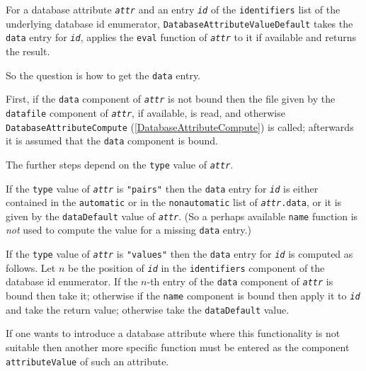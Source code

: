 \documentclass[a4paper,11pt]{report}
\begin{document}
{{{ For a database attribute \mbox{\texttt{\mdseries\slshape attr}} and an entry \mbox{\texttt{\mdseries\slshape id}} of the \texttt{identifiers} list of the underlying database id enumerator, \texttt{DatabaseAttributeValueDefault} takes the \texttt{data} entry for \mbox{\texttt{\mdseries\slshape id}}, applies the \texttt{eval} function of \mbox{\texttt{\mdseries\slshape attr}} to it if available and returns the result. 

 So the question is how to get the \texttt{data} entry. 

 First, if the \texttt{data} component of \mbox{\texttt{\mdseries\slshape attr}} is not bound then the file given by the \texttt{datafile} component of \mbox{\texttt{\mdseries\slshape attr}}, if available, is read, and otherwise \texttt{DatabaseAttributeCompute} (\ref{DatabaseAttributeCompute}) is called; afterwards it is assumed that the \texttt{data} component is bound. 

 The further steps depend on the \texttt{type} value of \mbox{\texttt{\mdseries\slshape attr}}. 

 If the \texttt{type} value of \mbox{\texttt{\mdseries\slshape attr}} is \texttt{"pairs"} then the \texttt{data} entry for \mbox{\texttt{\mdseries\slshape id}} is either contained in the \texttt{automatic} or in the \texttt{nonautomatic} list of \mbox{\texttt{\mdseries\slshape attr}}\texttt{.data}, or it is given by the \texttt{dataDefault} value of \mbox{\texttt{\mdseries\slshape attr}}. (So a perhaps available \texttt{name} function is \emph{not} used to compute the value for a missing \texttt{data} entry.) 

 If the \texttt{type} value of \mbox{\texttt{\mdseries\slshape attr}} is \texttt{"values"} then the \texttt{data} entry for \mbox{\texttt{\mdseries\slshape id}} is computed as follows. Let $n$ be the position of \mbox{\texttt{\mdseries\slshape id}} in the \texttt{identifiers} component of the database id enumerator. If the $n$-th entry of the \texttt{data} component of \mbox{\texttt{\mdseries\slshape attr}} is bound then take it; otherwise if the \texttt{name} component is bound then apply it to \mbox{\texttt{\mdseries\slshape id}} and take the return value; otherwise take the \texttt{dataDefault} value. 

 If one wants to introduce a database attribute where this functionality is not
suitable then another {\textendash}more specific{\textendash} function must be
entered as the component \texttt{attributeValue} of such an attribute. }

}}
\end{document}
